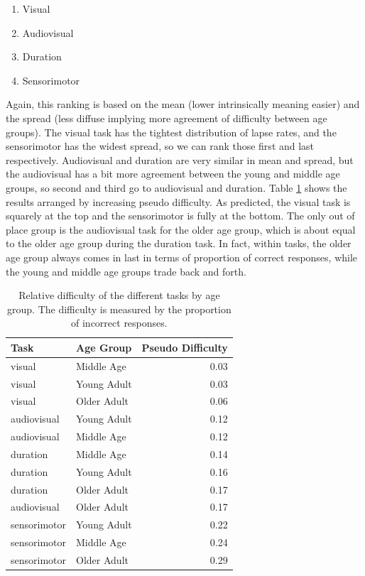 \documentclass[11pt, oneside, openany]{scrbook}
\providecommand{\tightlist}{%
  \setlength{\itemsep}{0pt}\setlength{\parskip}{0pt}}
\begin{document}
\begin{enumerate}
\def\labelenumi{\arabic{enumi}.}
\tightlist
\item
  Visual
\item
  Audiovisual
\item
  Duration
\item
  Sensorimotor
\end{enumerate}

Again, this ranking is based on the mean (lower intrinsically meaning easier) and the spread (less diffuse implying more agreement of difficulty between age groups). The visual task has the tightest distribution of lapse rates, and the sensorimotor has the widest spread, so we can rank those first and last respectively. Audiovisual and duration are very similar in mean and spread, but the audiovisual has a bit more agreement between the young and middle age groups, so second and third go to audiovisual and duration. Table \ref{tab:ch050-Orange-Tigerfish} shows the results arranged by increasing pseudo difficulty. As predicted, the visual task is squarely at the top and the sensorimotor is fully at the bottom. The only out of place group is the audiovisual task for the older age group, which is about equal to the older age group during the duration task. In fact, within tasks, the older age group always comes in last in terms of proportion of correct responses, while the young and middle age groups trade back and forth.

\begin{table}[!h]

\caption{\label{tab:ch050-Orange-Tigerfish}Relative difficulty of the different tasks by age group. The difficulty is measured by the proportion of incorrect responses.}
\centering
\begin{tabular}[t]{llr}
\toprule
Task & Age Group & Pseudo Difficulty\\
\midrule
visual & Middle Age & 0.03\\
visual & Young Adult & 0.03\\
visual & Older Adult & 0.06\\
audiovisual & Young Adult & 0.12\\
audiovisual & Middle Age & 0.12\\
\addlinespace
duration & Middle Age & 0.14\\
duration & Young Adult & 0.16\\
duration & Older Adult & 0.17\\
audiovisual & Older Adult & 0.17\\
sensorimotor & Young Adult & 0.22\\
\addlinespace
sensorimotor & Middle Age & 0.24\\
sensorimotor & Older Adult & 0.29\\
\bottomrule
\end{tabular}
\end{table}
\end{document}
